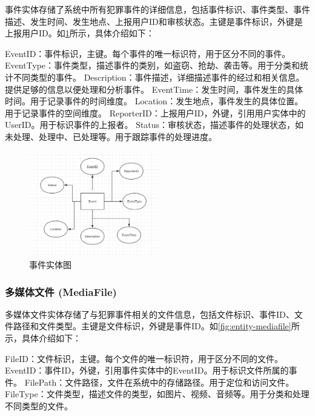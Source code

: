 事件实体存储了系统中所有犯罪事件的详细信息，包括事件标识、事件类型、事件描述、发生时间、发生地点、上报用户ID和审核状态。主键是事件标识，外键是上报用户ID。如\cref{fig:entity-event}所示，具体介绍如下：

EventID：事件标识，主键。每个事件的唯一标识符，用于区分不同的事件。
EventType：事件类型，描述事件的类别，如盗窃、抢劫、袭击等。用于分类和统计不同类型的事件。
Description：事件描述，详细描述事件的经过和相关信息。提供足够的信息以便处理和分析事件。
EventTime：发生时间，事件发生的具体时间。用于记录事件的时间维度。
Location：发生地点，事件发生的具体位置。用于记录事件的空间维度。
ReporterID：上报用户ID，外键，引用用户实体中的UserID。用于标识事件的上报者。
Status：审核状态，描述事件的处理状态，如未处理、处理中、已处理等。用于跟踪事件的处理进度。

\begin{figure}[h!]
    \centering
    \includegraphics[width=0.5\textwidth]{figures/db-img-02.png}
    \caption{事件实体图}
    \label{fig:entity-event}
\end{figure}

\subsubsection{多媒体文件 (MediaFile)}

多媒体文件实体存储了与犯罪事件相关的文件信息，包括文件标识、事件ID、文件路径和文件类型。主键是文件标识，外键是事件ID。如\cref{fig:entity-mediafile}所示，具体介绍如下：

FileID：文件标识，主键。每个文件的唯一标识符，用于区分不同的文件。
EventID：事件ID，外键，引用事件实体中的EventID。用于标识文件所属的事件。
FilePath：文件路径，文件在系统中的存储路径。用于定位和访问文件。
FileType：文件类型，描述文件的类型，如图片、视频、音频等。用于分类和处理不同类型的文件。

